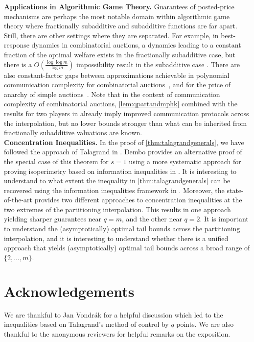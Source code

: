 \documentclass[11pt]{article}\usepackage{amsfonts}
\numberwithin{theorem}{subsection}
\begin{document}
\noindent\textbf{Applications in Algorithmic Game Theory.} Guarantees of posted-price mechanisms are perhaps the most notable domain within algorithmic game theory where fractionally subadditive and subadditive functions are far apart. Still, there are other settings where they are separated. For example, in best-response dynamics in combinatorial auctions, a dynamics leading to a constant fraction of the optimal welfare exists in the fractionally subadditive case, but there is a $O(\frac{\log \log m}{\log m})$ impossibility result in the subadditive case \cite{DuttingK22}. There are also constant-factor gaps between approximations achievable in polynomial communication complexity for combinatorial auctions~\cite{DobzinskiNS10,Feige09,EzraFNTW19}, and for the price of anarchy of simple auctions~\cite{RoughgardenST16}. Note that in the context of communication complexity of combinatorial auctions, \cref{lem:qpartandmphk} combined with the results for two players in 
\cite{EzraFNTW19} already imply improved communication protocols across the interpolation, but no lower bounds stronger than what can be inherited from fractionally subadditive valuations are known.\\

\noindent\textbf{Concentration Inequalities.} In the proof of \cref{thm:talagrandgenerals}, we have followed the approach of Talagrand in \cite{Talagrand96}. Dembo provides an alternative proof of the special case of this theorem for $s = 1$ using a more systematic approach 
for proving isoperimetry
based on
information inequalities in \cite{Dembo97}. It is interesting to understand to what extent the inequality in \cref{thm:talagrandgenerals} can be recovered using the information inequalities framework in \cite{Dembo97}. Moreover, the state-of-the-art provides two different approaches to concentration inequalities at the two extremes of the partitioning interpolation. This results in one approach yielding sharper guarantees near $q=m$, and the other near $q=2$. It is important to understand the (asymptotically) optimal tail bounds across the partitioning interpolation, and it is interesting to understand whether there is a unified approach that yields (asymptotically) optimal tail bounds across a broad range of $\{2,\ldots, m\}$.

\section*{Acknowledgements}
We are thankful to Jan Vondr{\'a}k for a helpful discussion which led to the inequalities based on Talagrand's method of control by $q$ points. We are also thankful to the anonymous reviewers for helpful remarks on the exposition. 
\end{document}

